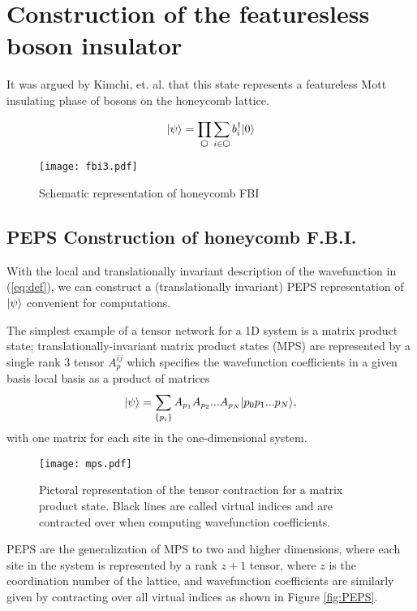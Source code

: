 
\section{Construction of the featuresless boson insulator}

It was argued by Kimchi, et. al. \cite{kimchi2013} that this state represents a featureless Mott insulating phase of bosons on the honeycomb lattice.

\begin{equation}
\ket{\psi} = \prod\limits_{\varhexagon} \sum\limits_{i \in \varhexagon} b^{\dagger}_{i} \ket{0}
\label{eq:def}
\end{equation}

\begin{figure}[H]
	\centering
	\texttt{[image: fbi3.pdf]}
	\caption{Schematic representation of honeycomb FBI}
\end{figure}

\subsection{PEPS Construction of honeycomb F.B.I.}

With the local and translationally invariant description of the wavefunction in (\ref{eq:def}), we can construct a (translationally invariant) PEPS representation of $\vert \psi \rangle$ convenient for computations. 

The simplest example of a tensor network for a 1D system is a matrix product state; translationally-invariant matrix product states (MPS) are represented by a single rank 3 tensor $A_p^{ij}$ which specifies the wavefunction coefficients in a given basis local basis as a product of matrices $$\vert \psi \rangle = \sum\limits_{\{p_i\}} A_{p_1} A_{p_2} ... A_{p_N} \vert p_0 p_1 ... p_N \rangle,$$
with one matrix for each site in the one-dimensional system.

\begin{figure}[H]
	\centering
	\texttt{[image: mps.pdf]}
	\caption{Pictoral representation of the tensor contraction for a matrix product state. Black lines are called virtual indices and are contracted over when computing wavefunction coefficients.}
	\label{fig:MPS}
\end{figure} 

PEPS are the generalization of MPS to two and higher dimensions, where each site in the system is represented by a rank $z+1$ tensor, where $z$ is the coordination number of the lattice, and wavefunction coefficients are similarly given by contracting over all virtual indices as shown in Figure \ref{fig:PEPS}.\cite{verstraete2004}

